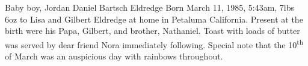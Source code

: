 Baby boy, Jordan Daniel Bartsch Eldredge Born March 11, 1985, 5:43am, 7lbs 6oz
to Lisa and Gilbert Eldredge at home in Petaluma California.  Present at the
birth were his Papa, Gilbert, and brother, Nathaniel.  Toast with loads of
butter was served by dear friend Nora immediately following.  Special note that
the 10\textsuperscript{th} of March was an auspicious day with rainbows
throughout.

